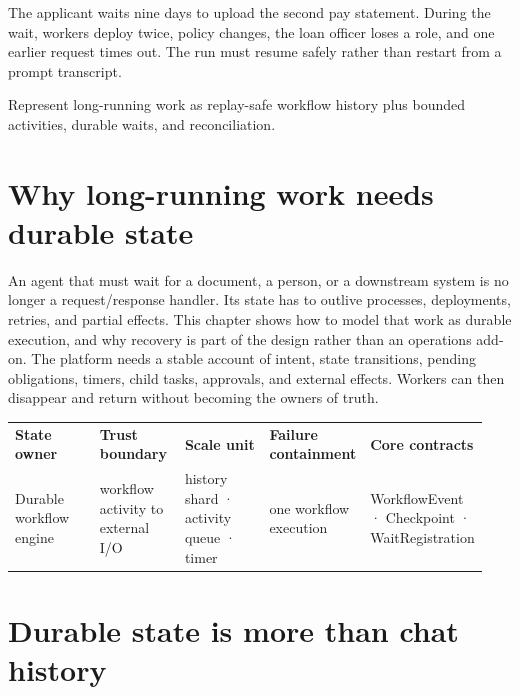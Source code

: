 \begin{bookcallout}
The applicant waits nine days to upload the second pay statement. During the wait, workers deploy twice, policy changes, the loan officer loses a role, and one earlier request times out. The run must resume safely rather than restart from a prompt transcript.
\end{bookcallout}

\begin{bookcallout}
Represent long-running work as replay-safe workflow history plus bounded activities, durable waits, and reconciliation.
\end{bookcallout}

\section{Why long-running work needs durable state}

An agent that must wait for a document, a person, or a downstream system is no longer a request/response handler. Its state has to outlive processes, deployments, retries, and partial effects. This chapter shows how to model that work as durable execution, and why recovery is part of the design rather than an operations add-on. The platform needs a stable account of intent, state transitions, pending obligations, timers, child tasks, approvals, and external effects. Workers can then disappear and return without becoming the owners of truth.\par

\BookTableStart
\fontsize{7.2}{9}\selectfont
\begin{tabular}{@{}Y{0.1880\linewidth}Y{0.1880\linewidth}Y{0.1880\linewidth}Y{0.1880\linewidth}Y{0.1880\linewidth}@{}}
\color{white}\bfseries \textbf{State owner} & \color{white}\bfseries \textbf{Trust boundary} & \color{white}\bfseries \textbf{Scale unit} & \color{white}\bfseries \textbf{Failure containment} & \color{white}\bfseries \textbf{Core contracts} \\
Durable workflow engine & workflow activity to external I/O & history shard · activity queue · timer & one workflow execution & WorkflowEvent · Checkpoint · WaitRegistration \\
\end{tabular}
\BookTableEnd

\section{Durable state is more than chat history}

